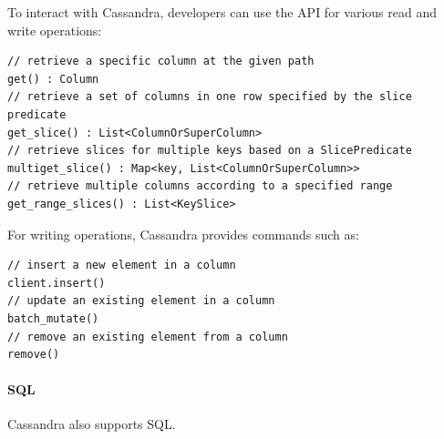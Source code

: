To interact with Cassandra, developers can use the API for various read and write operations:
\begin{lstlisting}[style=Java]
// retrieve a specific column at the given path
get() : Column
// retrieve a set of columns in one row specified by the slice predicate
get_slice() : List<ColumnOrSuperColumn>
// retrieve slices for multiple keys based on a SlicePredicate
multiget_slice() : Map<key, List<ColumnOrSuperColumn>>
// retrieve multiple columns according to a specified range
get_range_slices() : List<KeySlice>
\end{lstlisting}
For writing operations, Cassandra provides commands such as:
\begin{lstlisting}[style=Java]
// insert a new element in a column
client.insert()
// update an existing element in a column
batch_mutate()
// remove an existing element from a column
remove()
\end{lstlisting}

\paragraph*{SQL}
Cassandra also supports SQL.